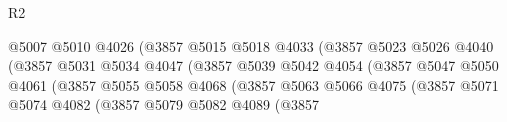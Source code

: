 \begin{lexlean}{R2}
\begin{coremodule}
                                                  @5007
                                                  @5010
                                                  @4026
                                                  (@3857
                                                    @5015
                                                    @5018
                                                    @4033
                                                    (@3857
                                                      @5023
                                                      @5026
                                                      @4040
                                                      (@3857
                                                        @5031
                                                        @5034
                                                        @4047
                                                        (@3857
                                                          @5039
                                                          @5042
                                                          @4054
                                                          (@3857
                                                            @5047
                                                            @5050
                                                            @4061
                                                            (@3857
                                                              @5055
                                                              @5058
                                                              @4068
                                                              (@3857
                                                                @5063
                                                                @5066
                                                                @4075
                                                                (@3857
                                                                  @5071
                                                                  @5074
                                                                  @4082
                                                                  (@3857
                                                                    @5079
                                                                    @5082
                                                                    @4089
                                                                    (@3857

\end{coremodule}
\end{lexlean}
